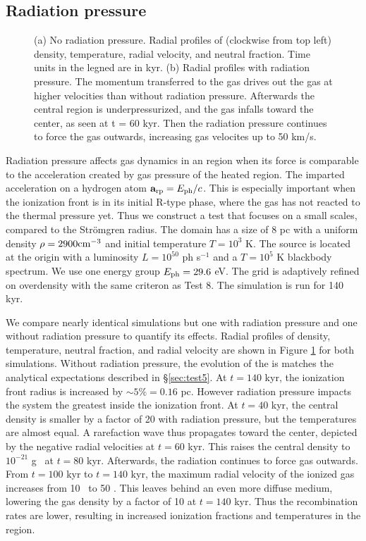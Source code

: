 \documentclass[12pt,preprint]{aastex}
\begin{document}
\subsection{Radiation pressure}

\begin{figure}[t]
  \caption{\label{fig:rp_profiles} (a) No radiation pressure.
    Radial profiles of (clockwise from top left) density, temperature,
    radial velocity, and neutral fraction.  Time units in the legned
    are in kyr.  (b) Radial profiles with radiation pressure.  The
    momentum transferred to the gas drives out the gas at higher
    velocities than without radiation pressure.  Afterwards the
    central region is underpressurized, and the gas infalls toward the
    center, as seen at t = 60 kyr.  Then the radiation pressure
    continues to force the gas outwards, increasing gas velocites up
    to 50 km/s.}
\end{figure}

Radiation pressure affects gas dynamics in an  region when
its force is comparable to the acceleration created by gas pressure of
the heated region.  The imparted acceleration on a hydrogen atom
$\mathbf{a}_{\rm rp} = E_{\rm ph}/c$.  This is especially important
when the ionization front is in its initial R-type phase, where the
gas has not reacted to the thermal pressure yet.  Thus we construct a
test that focuses on a small scales, compared to the Str\"{o}mgren
radius.  The domain has a size of 8 pc with a uniform density $\rho =
2900 \cubecm$ and initial temperature $T = 10^3$ K.  The source is
located at the origin with a luminosity $L = 10^{50}$ ph s$^{-1}$ and
a $T=10^5$ K blackbody spectrum.  We use one energy group $E_{\rm ph}
= 29.6$ eV.  The grid is adaptively refined on overdensity with the
same criteron as Test 8.  The simulation is run for 140 kyr.

We compare nearly identical simulations but one with radiation
pressure and one without radiation pressure to quantify its effects.
Radial profiles of density, temperature, neutral fraction, and radial
velocity are shown in Figure \ref{fig:rp_profiles} for both
simulations.  Without radiation pressure, the evolution of the
 is matches the analytical expectations described in
\S\ref{sec:test5}.  At $t=140$ kyr, the ionization front radius is
increased by $\sim5\% = 0.16$ pc.  However radiation pressure impacts
the system the greatest inside the ionization front.  At $t = 40$ kyr,
the central density is smaller by a factor of 20 with radiation
pressure, but the temperatures are almost equal.  A rarefaction wave
thus propagates toward the center, depicted by the negative radial
velocities at $t = 60$ kyr.  This raises the central density to
$10^{-21}$ g \cubecm~at $t = 80$ kyr.  Afterwards, the radiation
continues to force gas outwards.  From $t = 100$ kyr to $t = 140$ kyr,
the maximum radial velocity of the ionized gas increases from 10
\kms~to 50 \kms.  This leaves behind an even more diffuse medium,
lowering the gas density by a factor of 10 at $t = 140$ kyr.  Thus the
recombination rates are lower, resulting in increased ionization
fractions and temperatures in the  region.
\end{document}
